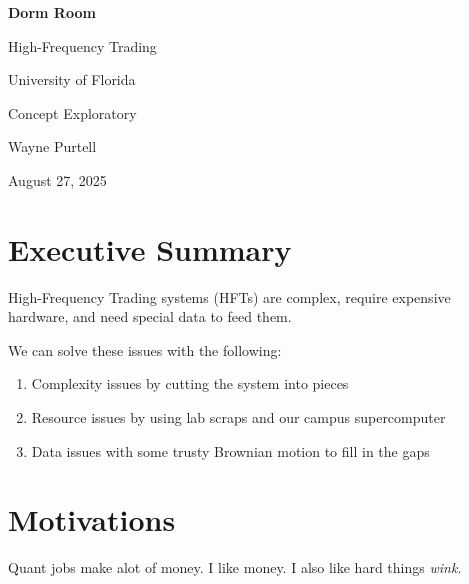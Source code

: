\documentclass[12pt]{article}
\begin{document}
\begin{titlepage}
  \centering
  {\Huge\bfseries Dorm Room \par High-Frequency Trading \par} %
  \vspace{.5cm}
  {\Large University of Florida \par}
  \vspace{2cm}
  {\Large Concept Exploratory \par}
  \vspace{1.5cm}
  {\large Wayne Purtell \par}
  \vspace{2cm}
  {\large August 27, 2025\par}
\end{titlepage}

\tableofcontents

\clearpage

\section*{Executive Summary}
High-Frequency Trading systems (HFTs) are complex, require expensive hardware, and need special data to feed them. 

We can solve these issues with the following:
\begin{enumerate}
  \item Complexity issues by cutting the system into pieces\,
  \item Resource issues by using lab scraps and our campus supercomputer\,
  \item Data issues with some trusty Brownian motion to fill in the gaps
\end{enumerate}

\clearpage


\section*{Motivations}
Quant jobs make alot of money. I like money. 
I also like hard things \emph{wink.}
\end{document}
